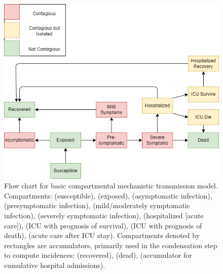 \documentclass[12pt]{article}\usepackage[]{graphicx}\usepackage[]{color}
\begin{document}
\begin{figure}
\includegraphics[width=\maxwidth]{figure/Macpan_Base_Epi-model.png}
\caption{Flow chart for basic compartmental mechanistic transmission model. 
Compartments:  (susceptible),  (exposed),  (asymptomatic infection),  (presymptomatic infection),  (mild/moderately symptomatic infection),  (severely symptomatic infection),  (hospitalized [acute care]),  (ICU with prognosis of survival),  (ICU with prognosis of death),  (acute care after ICU stay). 
Compartments denoted by rectangles are accumulators, primarily used in the condensation step to compute incidences:  (recovered),  (dead),  (accumulator for cumulative hospital admissions).
}
\label{fig:flowchart}
\end{figure}


\end{document}
